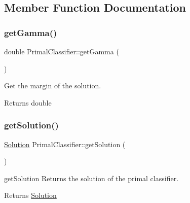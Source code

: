 \subsection{Member Function Documentation}
\mbox{\label{class_primal_classifier_a320c67c29eeb85d5d05f7db1de7fde41}} 
\subsubsection{\texorpdfstring{get\+Gamma()}{getGamma()}}
{\footnotesize\ttfamily double Primal\+Classifier\+::get\+Gamma (\begin{DoxyParamCaption}{ }\end{DoxyParamCaption})}



Get the margin of the solution. 

\begin{DoxyReturn}{Returns}
double 
\end{DoxyReturn}
\mbox{\label{class_primal_classifier_a1a3d9ba4e80c58418db0d8454168b910}} 
\subsubsection{\texorpdfstring{get\+Solution()}{getSolution()}}
{\footnotesize\ttfamily \hyperlink{class_solution}{Solution} Primal\+Classifier\+::get\+Solution (\begin{DoxyParamCaption}{ }\end{DoxyParamCaption})}



get\+Solution Returns the solution of the primal classifier. 

\begin{DoxyReturn}{Returns}
\hyperlink{class_solution}{Solution} 
\end{DoxyReturn}
\mbox{\label{class_primal_classifier_a49be3fca8d8383d98f9d671d1e1f27c7}} 
